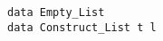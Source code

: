 \documentclass[12pt]{article}
\begin{document}
      \begin{verbatim}data Empty_List
data Construct_List t l\end{verbatim}
\begin{comment}
  \begin{frame}[fragile]{Some Uses of Type-Level Data}
    \begin{kood}{Lists With Type-Level Emptiness Information}
      \begin{verbatim}
data List' :: * -> * -> * where
  Empty :: List' False t
  Nonempty :: t -> List' b t -> List' True t\end{verbatim}
    \end{kood}
    \begin{kood}{Finite Rings}
      \begin{verbatim}
data Fin :: * -> * where
  FZero :: Fin (NSucc n)
  FSucc :: Fin n -> Fin (NSucc n)\end{verbatim}
    \end{kood}
    \begin{kood}{Vectors}
      \begin{verbatim}
data Vec :: * -> * -> * where
  VNil :: Vec NZero t
  VCons :: t -> Vec t n -> Vec (NSucc n) t\end{verbatim}
    \end{kood}
  \end{frame}
  \begin{frame}[fragile]{Some Uses of Type-Level Data}
    \begin{kood}{Boolean Functions (Shannon Expansions)}
      \begin{verbatim}
data Fun :: * -> * where
  Constant :: Bool -> Fun NZero
  Branch :: Fun n -> Fun n -> Fun (NSucc n)\end{verbatim}
    \end{kood}
    \begin{kood}{Generalised Tuples}
      \begin{verbatim}
data Prod :: * -> * where
  PNil :: Prod LNil
  PCons :: t -> Prod l -> Prod (LCons t l)\end{verbatim}
    \end{kood}
    \begin{kood}{Generalised Either}
      \begin{verbatim}
data Sum :: * -> * where
  SLeft :: t -> Sum (LCons t l)
  SRight :: (t -> Sum l) -> Sum (LCons u l)\end{verbatim}
    \end{kood}
  \end{frame}

\end{comment}
\end{document}
